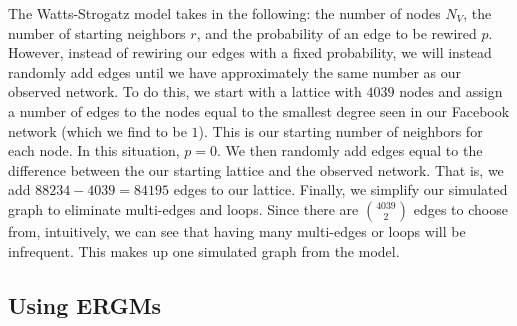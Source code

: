 \documentclass[12pt,twoside]{amherstthesis}
\begin{document}
  The Watts-Strogatz model takes in the following: the number of nodes
  \(N_{V}\), the number of starting neighbors \(r\), and the probability
  of an edge to be rewired \(p\). However, instead of rewiring our edges
  with a fixed probability, we will instead randomly add edges until we
  have approximately the same number as our observed network. To do this,
  we start with a lattice with \(4039\) nodes and assign a number of edges
  to the nodes equal to the smallest degree seen in our Facebook network
  (which we find to be \(1\)). This is our starting number of neighbors
  for each node. In this situation, \(p = 0\). We then randomly add edges
  equal to the difference between the our starting lattice and the
  observed network. That is, we add \(88234 - 4039 = 84195\) edges to our
  lattice. Finally, we simplify our simulated graph to eliminate
  multi-edges and loops. Since there are \(4039 \choose 2\) edges to
  choose from, intuitively, we can see that having many multi-edges or
  loops will be infrequent. This makes up one simulated graph from the
  model.
  
  \subsection{Using ERGMs}\label{using-ergms}
  
  \clearpage
  
\end{document}
